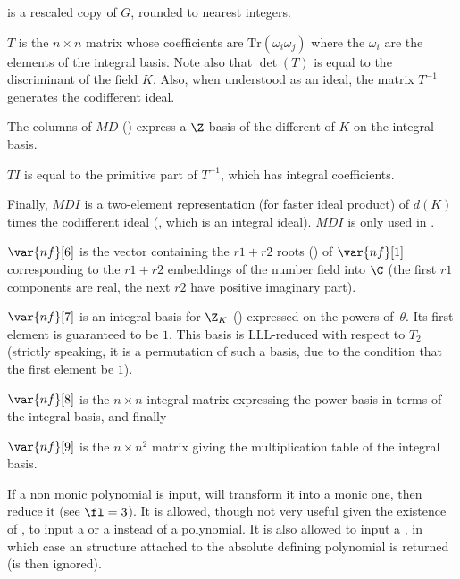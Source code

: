 \quad\item {} is a rescaled copy of $G$, rounded to nearest
integers.

\quad\item $T$ is the $n\times n$ matrix whose coefficients are
$\text{Tr}(\omega_i\omega_j)$ where the $\omega_i$ are the elements of the
integral basis. Note also that $\det(T)$ is equal to the discriminant of the
field $K$. Also, when understood as an ideal, the matrix $T^{-1}$
generates the codifferent ideal.

\quad\item The columns of $MD$ () express a $\Z$-basis
of the different of $K$ on the integral basis.

\quad\item $TI$ is equal to the primitive part of $T^{-1}$, which has integral
coefficients.

\quad\item Finally, $MDI$ is a two-element representation (for faster
ideal product) of $d(K)$ times the codifferent ideal
(, which is an integral ideal). $MDI$
is only used in .

$\var{nf}[6]$ is the vector containing the $r1+r2$ roots
() of $\var{nf}[1]$ corresponding to the $r1+r2$
embeddings of the number field into $\C$ (the first $r1$ components are real,
the next $r2$ have positive imaginary part).

$\var{nf}[7]$ is an integral basis for $\Z_K$ () expressed
on the powers of~$\theta$. Its first element is guaranteed to be $1$. This
basis is LLL-reduced with respect to $T_2$ (strictly speaking, it is a
permutation of such a basis, due to the condition that the first element be
$1$).

$\var{nf}[8]$ is the $n\times n$ integral matrix expressing the power
basis in terms of the integral basis, and finally

$\var{nf}[9]$ is the $n\times n^2$ matrix giving the multiplication table
of the integral basis.

If a non monic polynomial is input,  will transform it into a
monic one, then reduce it (see $\fl=3$). It is allowed, though not very
useful given the existence of , to input a  or a
 instead of a polynomial. It is also allowed to
input a , in which case an  structure attached to the
absolute defining polynomial  is returned (\fl is then ignored).

